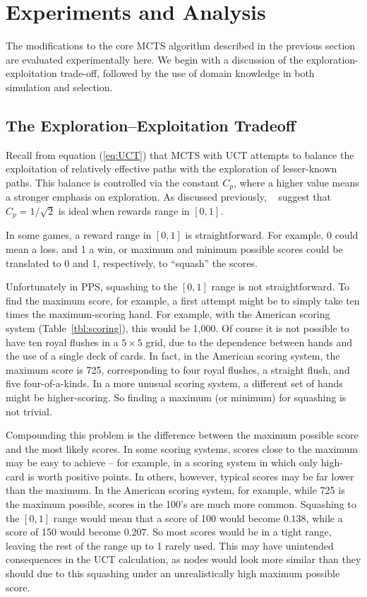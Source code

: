 \documentclass[letterpaper]{article}
\begin{document}
\section{Experiments and Analysis}

The modifications to the core MCTS algorithm described in the previous section are evaluated experimentally here. We begin with a discussion of the exploration-exploitation trade-off, followed by the use of domain knowledge in both simulation and selection.

\subsection{The Exploration--Exploitation Tradeoff}
Recall from equation (\ref{eq:UCT}) that MCTS with UCT attempts to balance the exploitation of relatively effective paths with the exploration of lesser-known paths. This balance is controlled via the constant $C_p$, where a higher value means a stronger emphasis on exploration. As discussed previously, ~\cite{kocsis2006improved} suggest that $C_p=1 / \sqrt{2}$ is ideal when rewards range in $[0,1]$. 

In some games, a reward range in $[0,1]$ is straightforward. For example, 0 could mean a loss, and 1 a win, or maximum and minimum possible scores could be translated to 0 and 1, respectively, to ``squash'' the scores.

Unfortunately in PPS, squashing to the $[0,1]$ range is not straightforward. To find the maximum score, for example, a first attempt might be to simply take ten times the maximum-scoring hand. For example, with the American scoring system (Table~\ref{tbl:scoring}), this would be 1,000. Of course it is not possible to have ten royal flushes in a $5\times5$ grid, due to the dependence between hands and the use of a single deck of cards. In fact, in the American scoring system, the maximum score is 725, corresponding to four royal flushes, a straight flush, and five four-of-a-kinds. In a more unusual scoring system, a different set of hands might be higher-scoring. So finding a maximum (or minimum) for squashing is not trivial.

Compounding this problem is the difference between the maximum possible score and the most likely scores. In some scoring systems, scores close to the maximum may be easy to achieve -- for example, in a scoring system in which only high-card is worth positive points. In others, however, typical scores may be far lower than the maximum. In the American scoring system, for example, while 725 is the maximum possible, scores in the 100's are much more common. Squashing to the $[0,1]$ range would mean that a score of 100 would become $0.138$, while a score of 150 would become $0.207$. So most scores would be in a tight range, leaving the rest of the range up to 1 rarely used. This may have unintended consequences in the UCT calculation, as nodes would look more similar than they should due to this squashing under an unrealistically high maximum possible score.
\end{document}
